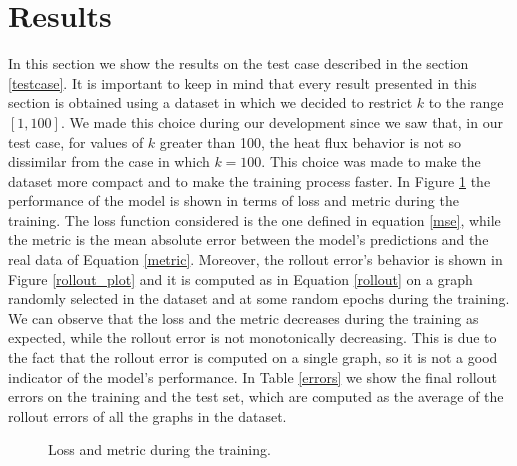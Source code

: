 \documentclass[11pt,a4paper]{article}
\begin{document}
\section{Results}
\label{results}
In this section we show the results on the test case described in the section \ref{testcase}. It is important to keep in mind that every result presented in this section is obtained using a dataset in which we decided to restrict \(k\) to the range \([1,100]\). We made this choice during our development since we saw that, in our test case, for values of \(k\) greater than 100, the heat flux behavior is not so dissimilar from the case in which \(k=100\).
This choice was made to make the dataset more compact and to make the training process faster.
In Figure \ref{loss} the performance of the model is shown in terms of loss and metric during the training. 
The loss function considered is the one defined in equation \eqref{mse}, while the metric is the mean absolute error between the model's predictions and the real data of Equation \eqref{metric}. 
Moreover, the rollout error's behavior is shown in Figure \ref{rollout_plot} and it is computed as in Equation \eqref{rollout} on a graph randomly selected in the dataset and at some random epochs during the training. We can observe that the loss and the metric decreases during the training as expected, while the rollout error is not monotonically decreasing. This is due to the fact that the rollout error is computed on a single graph, so it is not a good indicator of the model's performance.
In Table \ref{errors} we show the final rollout errors on the training and the test set, which are computed as the average of the rollout errors of all the graphs in the dataset.

\begin{figure}[H]
    \centering
    \caption{Loss and metric during the training.}
    \label{loss}
\end{figure}
\end{document}
